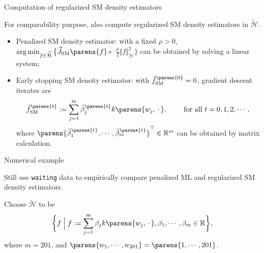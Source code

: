 \documentclass[aspectratio=169,xcolor=dvipsnames]{beamer}
\DeclareMathOperator*{\argmin}{arg\,min}
\newcommand{\SM}{\mathrm{SM}}
\newcommand{\calH}{\mathcal{H}}
\begin{document}
\begin{frame}{Computation of regularized SM density estimators}
	
	For comparability purpose, also compute regularized SM density estimators in $\widetilde{\calH}$. 
	
	\vspace{5pt}
	
	\begin{itemize}
		\item Penalized SM density estimator: with a fixed $\rho > 0$, $\argmin_{f \in \widetilde{\calH}} \big\{\widehat{J}_{\SM} \parens{f} + $ $ \frac{\rho}{2} \Vert f \Vert_{\mathcal{H}}^2 \big\}$ can be obtained by solving a linear system; %
		
		\vspace{5pt}
		
		\item Early stopping SM density estimator:
		with $\tilde{f}_{\SM}^{\parens{0}} = 0$, gradient descent iterates are 
		\begin{align*}
			\tilde{f}_{\SM}^{\parens{t}} := \sum_{j=1}^m \tilde{\beta}_j^{\parens{t}} k \parens{w_j, \,\cdot\,}, \qquad \text{ for all } t = 0, 1, 2, \cdots, 
		\end{align*}
		where $\parens{\tilde{\beta}_1^{\parens{t}}, \cdots, \tilde{\beta}_m^{\parens{t}}}^\top \in \mathbb{R}^m$ can be obtained by matrix calculation. %
	\end{itemize}
	
\end{frame}


\begin{frame}{Numerical example}
	
	Still use \texttt{waiting} data to empirically compare penalized ML and regularized SM density estimators. 
	
	\vspace{5pt}
	
	Choose $\widetilde{\calH}$ to be 
	\begin{align}
		\bigg\{ f \Bigm| f := \sum_{j=1}^m \beta_j k \parens{w_j, \,\cdot\,}, \beta_1, \cdots, \beta_m \in \mathbb{R} \bigg\}, 
	\end{align}
	where $m = 201$, and $\parens{w_1, \cdots, w_{201}} = \parens{1, \cdots, 201}$. 
		
\end{frame}
\end{document}
